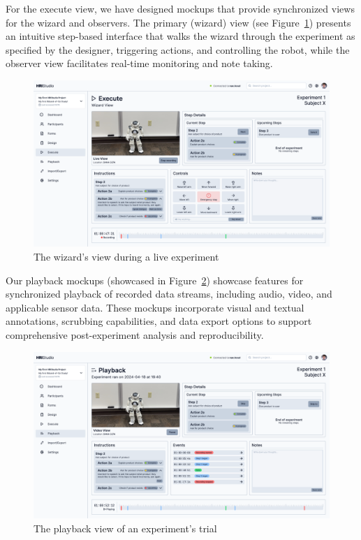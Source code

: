 \documentclass[letterpaper, 10 pt, conference]{ieeeconf}
\begin{document}
For the execute view, we have designed mockups that provide synchronized views for the wizard and observers. The primary (wizard) view (see Figure~\ref{fig:execute}) presents an intuitive step-based interface that walks the wizard through the experiment as specified by the designer, triggering actions, and controlling the robot, while the observer view facilitates real-time monitoring and note taking.

\begin{figure}[h]
    \begin{center}
        \includegraphics[width=0.4\paperwidth]{assets/mockups/execute}
         \vskip -0.3cm
        \caption{The wizard's view during a live experiment}
        \label{fig:execute}
    \end{center}
    \vskip -0.5cm
\end{figure}

Our playback mockups (showcased in Figure~\ref{fig:playback}) showcase features for synchronized playback of recorded data streams, including audio, video, and applicable sensor data. These mockups incorporate visual and textual annotations, scrubbing capabilities, and data export options to support comprehensive post-experiment analysis and reproducibility.

\begin{figure}[h]
    \begin{center}
        \includegraphics[width=0.4\paperwidth]{assets/mockups/playback}
         \vskip -0.3cm
        \caption{The playback view of an experiment's trial}
        \label{fig:playback}
    \end{center}
    \vskip -0.7cm
\end{figure}
\end{document}
